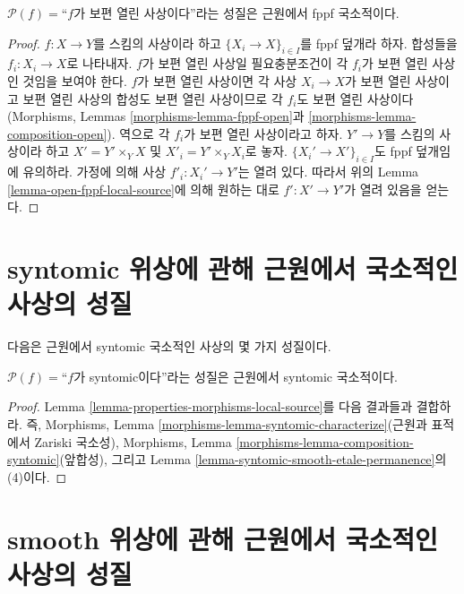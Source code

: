 \begin{lemma}
\label{lemma-universally-open-fppf-local-source}
$\mathcal{P}(f)=$``$f$가 보편 열린 사상이다''라는 성질은
근원에서 fppf 국소적이다.
\end{lemma}

\begin{proof}
$f : X \to Y$를 스킴의 사상이라 하고
$\{X_i \to X\}_{i \in I}$를 fppf 덮개라 하자.
합성들을 $f_i : X_i \to X$로 나타내자.
$f$가 보편 열린 사상일 필요충분조건이 각 $f_i$가 보편 열린
사상인 것임을 보여야 한다. $f$가 보편 열린 사상이면 각 사상
$X_i \to X$가 보편 열린 사상이고 보편 열린 사상의 합성도 보편
열린 사상이므로 각 $f_i$도 보편 열린 사상이다
(Morphisms, Lemmas \ref{morphisms-lemma-fppf-open}과
\ref{morphisms-lemma-composition-open}).
역으로 각 $f_i$가 보편 열린 사상이라고 하자. $Y' \to Y$를 스킴의
사상이라 하고 $X' = Y' \times_Y X$ 및 $X'_i = Y' \times_Y X_i$로
놓자. $\{X_i' \to X'\}_{i \in I}$도 fppf 덮개임에 유의하라.
가정에 의해 사상 $f'_i : X_i' \to Y'$는 열려 있다. 따라서 위의
Lemma \ref{lemma-open-fppf-local-source}에 의해 원하는 대로
$f' : X' \to Y'$가 열려 있음을 얻는다.
\end{proof}



\section{syntomic 위상에 관해 근원에서 국소적인 사상의 성질}
\label{section-syntomic-local-source}

\noindent
다음은 근원에서 syntomic 국소적인 사상의 몇 가지 성질이다.

\begin{lemma}
\label{lemma-syntomic-syntomic-local-source}
$\mathcal{P}(f)=$``$f$가 syntomic이다''라는 성질은
근원에서 syntomic 국소적이다.
\end{lemma}

\begin{proof}
Lemma \ref{lemma-properties-morphisms-local-source}를 다음 결과들과
결합하라. 즉, Morphisms, Lemma
\ref{morphisms-lemma-syntomic-characterize}(근원과 표적에서 Zariski
국소성), Morphisms, Lemma
\ref{morphisms-lemma-composition-syntomic}(앞합성), 그리고 Lemma
\ref{lemma-syntomic-smooth-etale-permanence}의 (4)이다.
\end{proof}




\section{smooth 위상에 관해 근원에서 국소적인 사상의 성질}
\label{section-smooth-local-source}

